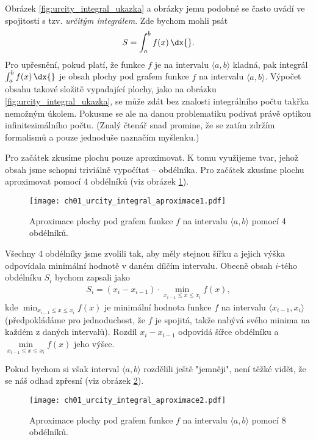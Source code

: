 Obrázek \ref{fig:urcity_integral_ukazka} a obrázky jemu podobné se často uvádí ve spojitosti s tzv. \emph{určitým integrálem}. Zde bychom mohli psát
\begin{align*}
S=\int_{a}^{b}{f(x)\,\dx{}}.
\end{align*}
Pro upřesnění, pokud platí, že funkce $f$ je na intervalu $\langle a,b \rangle$ kladná, pak integrál $\int_a^b{f(x)\,\dx{}}$ je obsah plochy pod grafem funkce $f$ na intervalu $\langle a,b \rangle$. Výpočet obsahu takové složitě vypadající plochy, jako na obrázku \ref{fig:urcity_integral_ukazka}, se může zdát bez znalosti integrálního počtu takřka nemožným úkolem. Pokusme se ale na danou problematiku podívat právě optikou infinitezimálního počtu. (Znalý čtenář snad promine, že se zatím zdržím formalismů a pouze jednoduše naznačím myšlenku.)\par
Pro začátek zkusíme plochu pouze aproximovat. K tomu využijeme tvar, jehož obsah jsme schopni triviálně vypočítat -- obdélníka. Pro začátek zkusíme plochu aproximovat pomocí 4 obdélníků (viz obrázek \ref{fig:urcity_integral_aproximace1}).
\begin{figure}[h]
	\centering
	\texttt{[image: ch01\_urcity\_integral\_aproximace1.pdf]}
	\caption{Aproximace plochy pod grafem funkce $f$ na intervalu $\langle a,b \rangle$ pomocí 4 obdélníků.}
	\label{fig:urcity_integral_aproximace1}
\end{figure}
Všechny 4 obdélníky jsme zvolili tak, aby měly stejnou šířku a jejich výška odpovídala minimální hodnotě v daném dílčím intervalu. Obecně obsah $i$-tého obdélníku $S_i$ bychom zapsali jako
\begin{align*}
S_i= (x_i-x_{i-1}) \cdot \min\limits_{x_{i-1} \leq x \leq x_i}{f(x)},
\end{align*}
kde $\min_{x_{i-1} \leq x \leq x_i}{f(x)}$ je minimální hodnota funkce $f$ na intervalu $\langle x_{i-1},x_i \rangle$ (předpokládáme pro jednoduchost, že $f$ je spojitá, takže nabývá svého minima na každém z daných intervalů). Rozdíl $x_i-x_{i-1}$ odpovídá šířce obdélníku a $\min\limits_{x_{i-1} \leq x \leq x_i}{f(x)}$ jeho výšce.\par
Pokud bychom si však interval $\langle a,b \rangle$ rozdělili ještě "jemněji", není těžké vidět, že se náš odhad zpřesní (viz obrázek \ref{fig:urcity_integral_aproximace2}).
\begin{figure}[h]
	\centering	\texttt{[image: ch01\_urcity\_integral\_aproximace2.pdf]}
	\caption{Aproximace plochy pod grafem funkce $f$ na intervalu $\langle a,b \rangle$ pomocí 8 obdélníků.}
	\label{fig:urcity_integral_aproximace2}
\end{figure}
